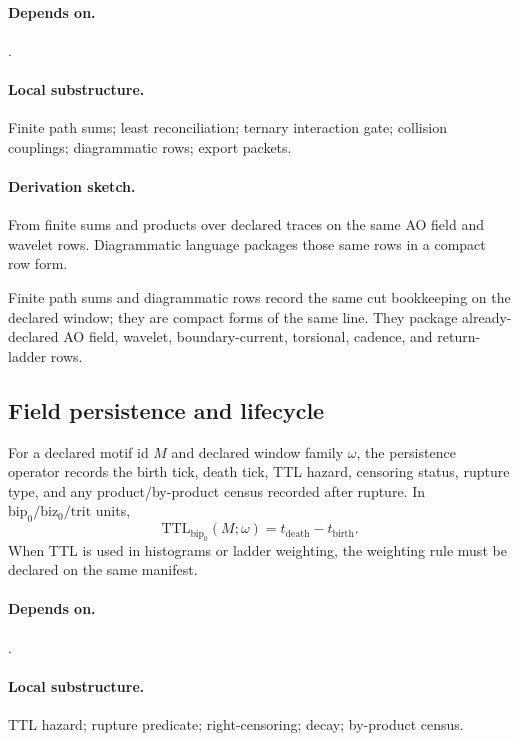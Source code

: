 \paragraph{Depends on.} .
\paragraph{Local substructure.} Finite path sums; least reconciliation; ternary interaction gate; collision couplings; diagrammatic rows; export packets.
\paragraph{Derivation sketch.} From finite sums and products over declared traces on the same AO field and wavelet rows. Diagrammatic language packages those same rows in a compact row form.
\begin{remarkx}
Finite path sums and diagrammatic rows record the same cut bookkeeping on the declared window; they are compact forms of the same line. They package already-declared AO field, wavelet, boundary-current, torsional, cadence, and return-ladder rows.
\end{remarkx}


\subsection{Field persistence and lifecycle}\label{subsec:field-persistence-lifecycle}
\begin{definition}
\label{def:field-lifecycle-operator}
For a declared motif id $M$ and declared window family $\omega$, the persistence operator records the birth tick, death tick, TTL hazard, censoring status, rupture type, and any product/by-product census recorded after rupture. In \(\mathrm{bip}_0/\mathrm{biz}_0/\mathrm{trit}\) units,
\[
\mathrm{TTL}_{\mathrm{bip}_0}(M;\omega)=t_{\mathrm{death}}-t_{\mathrm{birth}}.
\]
When TTL is used in histograms or ladder weighting, the weighting rule must be declared on the same manifest.
\end{definition}

\paragraph{Depends on.} .
\paragraph{Local substructure.} TTL hazard; rupture predicate; right-censoring; decay; by-product census.
